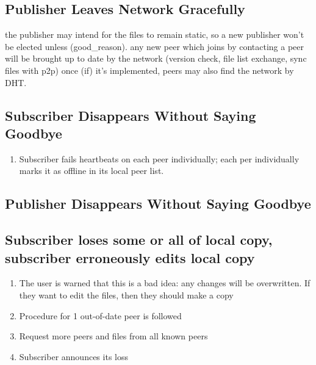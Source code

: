 \documentclass[12pt,a4paper,]{adreport}
\begin{document}
\subsection{Publisher Leaves Network
Gracefully}\label{publisher-leaves-network-gracefully}

the publisher may intend for the files to remain static, so a new
publisher won't be elected unless (good\_reason). any new peer which
joins by contacting a peer will be brought up to date by the network
(version check, file list exchange, sync files with p2p) once (if) it's
implemented, peers may also find the network by DHT.

\subsection{Subscriber Disappears Without Saying
Goodbye}\label{subscriber-disappears-without-saying-goodbye}

\begin{enumerate}
\def\labelenumi{\arabic{enumi}.}
\itemsep1pt\parskip0pt
\item
  Subscriber fails heartbeats on each peer individually; each per
  individually marks it as offline in its local peer list.
\end{enumerate}

\subsection{Publisher Disappears Without Saying
Goodbye}\label{publisher-disappears-without-saying-goodbye}

\subsection{Subscriber loses some or all of local copy, subscriber
erroneously edits local
copy}\label{subscriber-loses-some-or-all-of-local-copy-subscriber-erroneously-edits-local-copy}

\begin{enumerate}
\def\labelenumi{\arabic{enumi}.}
\itemsep1pt\parskip0pt
\item
  The user is warned that this is a bad idea: any changes will be
  overwritten. If they want to edit the files, then they should make a
  copy
\item
  Procedure for 1 out-of-date peer is followed
\item
  Request more peers and files from all known peers
\item
  Subscriber announces its loss
\end{enumerate}
\end{document}
